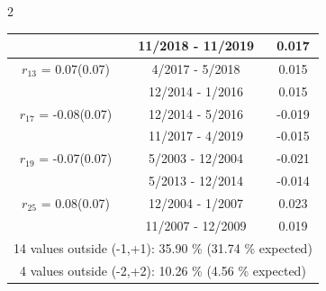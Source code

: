 \begin{multicols}{2}
{\begin{tabular}{ccc}
&       11/2018 - 11/2019 &        0.017  \vspace{-.02in} \\ \hline 
  $r_{13}$ = 0.07(0.07) &       4/2017 -  5/2018 &        0.015   \vspace{-.10in} \\  
&       12/2014 -  1/2016 &        0.015  \vspace{-.02in} \\ \hline 
  $r_{17}$ = -0.08(0.07) &      12/2014 -  5/2016 &       -0.019    \vspace{-.10in} \\ 
  &       11/2017 -  4/2019 &       -0.015  \vspace{-.02in}   \\ \hline 
    $r_{19}$ = -0.07(0.07) &       5/2003 - 12/2004 &       -0.021    \vspace{-.10in} \\ 
  &        5/2013 - 12/2014 &       -0.014  \vspace{-.02in}   \\ \hline 
    $r_{25}$ = 0.08(0.07) &      12/2004 -  1/2007 &        0.023   \vspace{-.10in} \\  
&       11/2007 - 12/2009 &        0.019  \vspace{-.02in} \\ \hline 
\multicolumn{3}{c}{              14 values outside (-1,+1): 35.90  \% (31.74  \% expected)}\vspace{-.10in} \\ 
\multicolumn{3}{c}{               4 values outside (-2,+2): 10.26 \%  (4.56 \% expected) } \\
 \end{tabular} \\ 
 } 
\end{multicols} 

